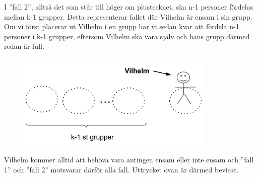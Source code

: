 \documentclass[nobib]{tufte-handout}
\begin{document}
\begin{xca2}
I ”fall 2”, alltså det som står till höger om plustecknet, ska n-1 personer fördelas mellan k-1 grupper. Detta representerar fallet där Vilhelm är ensam i sin grupp. Om vi först placerar ut Vilhelm i en grupp har vi sedan kvar att fördela n-1 personer i k-1 grupper, eftersom Vilhelm ska vara själv och hans grupp därmed redan är full.

   \begin{figure}[h]
\includegraphics[width=95mm]{ovning_1.2.png}
\end{figure}
Vilhelm kommer alltid att behöva vara antingen ensam eller inte ensam och ”fall 1” och ”fall 2” motsvarar därför alla fall. Uttrycket ovan är därmed bevisat. 
\end{xca2}
\end{document}
